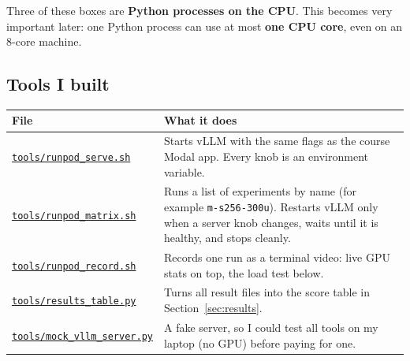 \documentclass[10pt,a4paper]{article}
\newcommand{\repo}{https://github.com/himanshu1573/qwen-vl-inference-arena}
\newcommand{\file}[1]{\href{\repo/blob/main/#1}{\nolinkurl{#1}}}
\begin{document}
\begin{center}
\end{center}
Three of these boxes are \textbf{Python processes on the CPU}. This becomes very important later: one Python process can use at most \textbf{one CPU core}, even on an 8-core machine.

\subsection{Tools I built}
\begin{center}\small
\begin{tabularx}{\linewidth}{@{}l X@{}}
\toprule
\textbf{File} & \textbf{What it does} \\
\midrule
\file{tools/runpod_serve.sh} & Starts vLLM with the same flags as the course Modal app. Every knob is an environment variable. \\
\file{tools/runpod_matrix.sh} & Runs a list of experiments by name (for example \texttt{m-s256-300u}). Restarts vLLM only when a server knob changes, waits until it is healthy, and stops cleanly. \\
\file{tools/runpod_record.sh} & Records one run as a terminal video: live GPU stats on top, the load test below. \\
\file{tools/results_table.py} & Turns all result files into the score table in Section~\ref{sec:results}. \\
\file{tools/mock_vllm_server.py} & A fake server, so I could test all tools on my laptop (no GPU) before paying for one. \\
\bottomrule
\end{tabularx}
\end{center}
\end{document}
